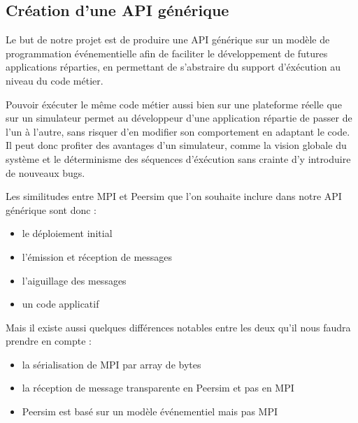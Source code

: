 \documentclass{article}
\begin{document}
			\subsection{Création d'une API générique}
				Le but de notre projet est de produire une API générique sur un modèle de programmation événementielle afin de faciliter le développement de futures applications réparties, en permettant de s'abstraire du support d'éxécution au niveau du code métier. \par
Pouvoir éxécuter le même code métier aussi bien sur une plateforme réelle que sur un simulateur permet au développeur d'une application répartie de passer de l'un à l'autre, sans risquer d'en  modifier son comportement en adaptant le code. \newline Il peut donc profiter des avantages d'un simulateur, comme la vision globale du système et le déterminisme des séquences d'éxécution  sans crainte d'y introduire de nouveaux bugs. \par
Les similitudes entre MPI et Peersim que l'on souhaite inclure dans notre API générique sont donc : 
\begin{itemize}
\item le déploiement initial
\item l'émission et réception de messages
\item l'aiguillage des messages
\item un code applicatif
\end{itemize}
Mais il existe aussi quelques différences notables entre les deux qu'il nous faudra prendre en compte : 
\begin{itemize}
\item la sérialisation de MPI par array de bytes
\item la réception de message transparente en Peersim et pas en MPI
\item Peersim est basé sur un modèle événementiel mais pas MPI
\end{itemize}
 
			\newpage
\end{document}
